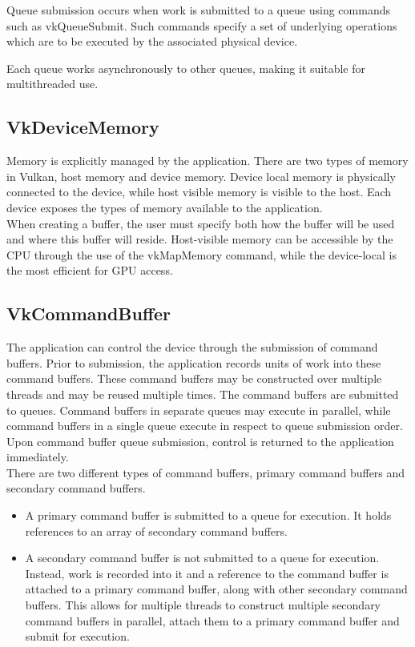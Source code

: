 \documentclass[12pt]{report}
\theoremstyle{definition}
\begin{document}
        Queue submission occurs when work is submitted to a queue using commands
        such as vkQueueSubmit. Such commands specify a set of underlying
        operations which are to be executed by the associated physical
        device. 

        Each queue works asynchronously to other queues, making it suitable for
        multithreaded use.

      \subsection{VkDeviceMemory}

        Memory is explicitly managed by the application. There are two types of
        memory in Vulkan, host memory and device memory. Device local memory is
        physically connected to the device, while host visible memory is
        visible to the host. Each device exposes the types of memory available
        to the application. \\

        When creating a buffer, the user must specify both how the buffer will
        be used and where this buffer will reside. Host-visible memory can be
        accessible by the CPU through the use of the vkMapMemory command, while
        the device-local is the most efficient for GPU access.

      \subsection{VkCommandBuffer}

        The application can control the device through the submission of command
        buffers. Prior to submission, the application records units of work
        into these command buffers. These command buffers may be constructed
        over multiple threads and may be reused multiple times. The command
        buffers are submitted to queues. Command buffers in separate queues
        may execute in parallel, while command buffers in a single queue
        execute in respect to queue submission order. Upon command buffer
        queue submission, control is returned to the application immediately. \\

        There are two different types of command buffers,
        primary command buffers and secondary command buffers.

        \begin{itemize}
          \item A primary command buffer is submitted to a queue for execution.
          It holds references to an array of secondary command buffers.
          \item A secondary command buffer is not submitted to a queue for
          execution. Instead, work is recorded into it and a reference to the
          command buffer is attached to a primary command buffer, along with
          other secondary command buffers. This allows for multiple threads to
          construct multiple secondary command buffers in parallel, attach
          them to a primary command buffer and submit for execution.
        \end{itemize}
\end{document}
